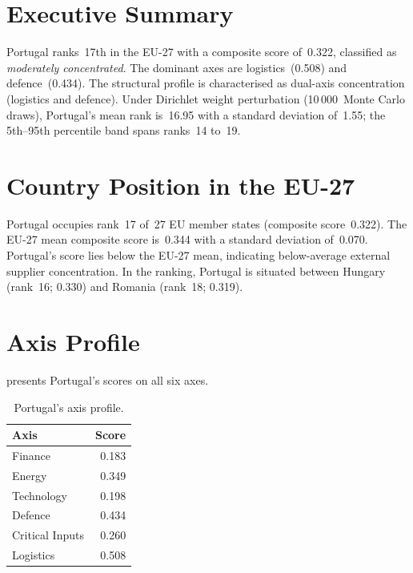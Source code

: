 \documentclass[12pt,a4paper]{article}
\begin{document}
\hypersetup{pageanchor=true}
\pagestyle{fancy}
\renewcommand{\headrulewidth}{0.4pt}


\section{Executive Summary}
\label{sec:summary}

Portugal ranks~17th in the EU-27 with a composite \ISI score of~0.322, classified as \emph{moderately concentrated}.  The dominant axes are logistics~(0.508) and defence~(0.434).  The structural profile is characterised as dual-axis concentration (logistics and defence).  Under Dirichlet weight perturbation (10\,000~Monte Carlo draws), Portugal's mean rank is~16.95 with a standard deviation of~1.55; the 5th--95th percentile band spans ranks~14 to~19.


\section{Country Position in the EU-27}
\label{sec:position}

Portugal occupies rank~17 of~27 EU member states (composite score~0.322).  The EU-27 mean composite score is~0.344 with a standard deviation of~0.070.  Portugal's score lies below the EU-27 mean, indicating below-average external supplier concentration.  In the ranking, Portugal is situated between Hungary (rank~16; 0.330) and Romania (rank~18; 0.319).


\section{Axis Profile}
\label{sec:axis-profile}

 presents Portugal's scores on all six \ISI axes.

\begin{table}[htbp]
\centering\small
\caption{Portugal's \ISI axis profile.}
\label{tab:axis-profile}
\begin{tabular}{@{}lr@{}}
\toprule
\textbf{Axis} & \textbf{Score} \\
\midrule
    Finance           & 0.183 \\
    Energy            & 0.349 \\
    Technology        & 0.198 \\
    Defence           & 0.434 \\
    Critical Inputs   & 0.260 \\
    Logistics         & 0.508 \\
\bottomrule
\end{tabular}
\end{table}
\end{document}
